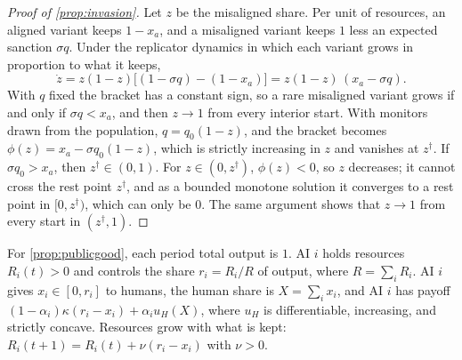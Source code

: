 \documentclass[article, 11pt, reqno]{amsart}
\theoremstyle{named}
\theoremstyle{plain}
\begin{document}
\begin{proof}[Proof of \cref{prop:invasion}]
Let $z$ be the misaligned share. Per unit of resources, an aligned variant keeps $1 - x_a$, and a misaligned variant keeps $1$ less an expected sanction $\sigma q$. Under the replicator dynamics in which each variant grows in proportion to what it keeps,
\[
\dot z = z(1-z)\big[(1 - \sigma q) - (1 - x_a)\big] = z(1-z)\,(x_a - \sigma q).
\]
With $q$ fixed the bracket has a constant sign, so a rare misaligned variant grows if and only if $\sigma q < x_a$, and then $z \to 1$ from every interior start. With monitors drawn from the population, $q = q_0(1-z)$, and the bracket becomes $\phi(z) = x_a - \sigma q_0(1-z)$, which is strictly increasing in $z$ and vanishes at $z^\dagger$. If $\sigma q_0 > x_a$, then $z^\dagger \in (0,1)$. For $z \in (0, z^\dagger)$, $\phi(z) < 0$, so $z$ decreases; it cannot cross the rest point $z^\dagger$, and as a bounded monotone solution it converges to a rest point in $[0, z^\dagger)$, which can only be $0$. The same argument shows that $z \to 1$ from every start in $(z^\dagger, 1)$.
\end{proof}

For \cref{prop:publicgood}, each period total output is $1$. AI $i$ holds resources $R_i(t) > 0$ and controls the share $r_i = R_i/R$ of output, where $R = \sum_i R_i$. AI $i$ gives $x_i \in [0, r_i]$ to humans, the human share is $X = \sum_i x_i$, and AI $i$ has payoff $(1-\alpha_i)\kappa(r_i - x_i) + \alpha_i u_H(X)$, where $u_H$ is differentiable, increasing, and strictly concave. Resources grow with what is kept: $R_i(t+1) = R_i(t) + \nu(r_i - x_i)$ with $\nu > 0$.
\end{document}
